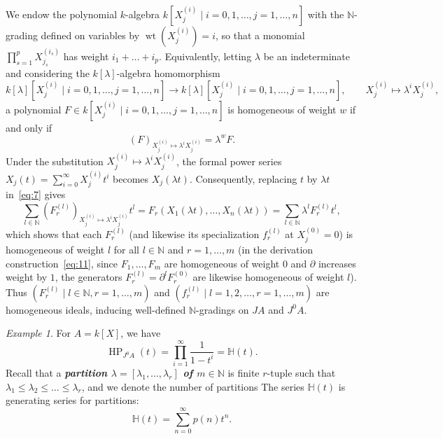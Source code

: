 \documentclass[a4paper, 12pt]{amsart}
\newcommand{\defterm}[1]{\textbf{\textit{#1}}\index{#1}}
\theoremstyle{remark}
\newtheorem{example}[theorem]{Example}
\begin{document}
We endow the polynomial $k$-algebra $k[X^{(i)}_j \mid i = 0, 1, \dots, j = 1, \dots, n]$ with the $\mathbb{N}$-grading defined on variables by $\operatorname{wt}(X^{(i)}_j) = i$,
so that a monomial $\prod_{s = 1}^p X^{(i_s)}_{j_s}$ has weight $i_1 + \dots + i_p$.
Equivalently,
letting $\lambda$ be an indeterminate and considering the $k[\lambda]$-algebra homomorphism
\begin{equation*}
  k[\lambda][X^{(i)}_j \mid i = 0, 1, \dots, j = 1, \dots, n] \longrightarrow k[\lambda][X^{(i)}_j \mid i = 0, 1, \dots, j = 1, \dots, n], \qquad
  X^{(i)}_j \longmapsto \lambda^i X^{(i)}_j,
\end{equation*}
a polynomial $F \in k[X^{(i)}_j \mid i = 0, 1, \dots, j = 1, \dots, n]$ is homogeneous of weight $w$ if and only if
\begin{equation*}
  (F)_{X^{(i)}_j \mapsto \lambda^i X^{(i)}_j} = \lambda^w F.
\end{equation*}
Under the substitution $X^{(i)}_j \mapsto \lambda^i X^{(i)}_j$,
the formal power series $X_j(t) = \sum_{i = 0}^\infty X^{(i)}_j t^i$ becomes $X_j(\lambda t)$.
Consequently,
replacing $t$ by $\lambda t$ in~\eqref{eq:7} gives
\begin{equation*}
  \sum_{l \in \mathbb{N}} (F_r^{(l)})_{X^{(i)}_j \mapsto \lambda^i X^{(i)}_j} t^l
  = F_r\left(X_1(\lambda t), \dots, X_n(\lambda t)\right)
  = \sum_{l \in \mathbb{N}} \lambda^l F_r^{(l)} t^l,
\end{equation*}
which shows that each $F_r^{(l)}$ (and likewise its specialization $f_r^{(l)}$ at $X^{(0)}_j = 0$) is homogeneous of weight $l$ for all $l \in \mathbb{N}$ and $r = 1, \dots, m$
(in the derivation construction~\eqref{eq:11}, since $F_1, \dots, F_m$ are homogeneous of weight $0$ and $\partial$ increases weight by $1$, the generators $F_r^{(l)} = \partial^l F_r^{(0)}$ are likewise homogeneous of weight $l$).
Thus $(F_r^{(l)} \mid l \in \mathbb{N}, r = 1, \dots, m)$ and $(f_r^{(l)} \mid l = 1, 2, \dots, r = 1, \dots, m)$ are homogeneous ideals,
inducing well-defined $\mathbb{N}$-gradings on $J A$ and $J^0 A$.

\begin{example}
  \label{exa:1}
  For $A = k[X]$, we have
  \begin{equation*}
    \operatorname{HP}_{J^0 A}(t) = \prod_{i = 1}^\infty \frac{1}{1 - t^i} = \mathbb{H}(t).
  \end{equation*}
  Recall that a \defterm{partition $\lambda = [\lambda_1, \dots, \lambda_r]$ of $m \in \mathbb{N}$} is finite $r$-tuple such that $\lambda_1 \le \lambda_2 \le \dots \le \lambda_r$, and we denote the number of partitions
  The series $\mathbb{H}(t)$ is generating series for partitions:
  \begin{equation*}
    \mathbb{H}(t) = \sum_{n = 0}^\infty p(n)t^n.
  \end{equation*}
\end{example}
\end{document}

